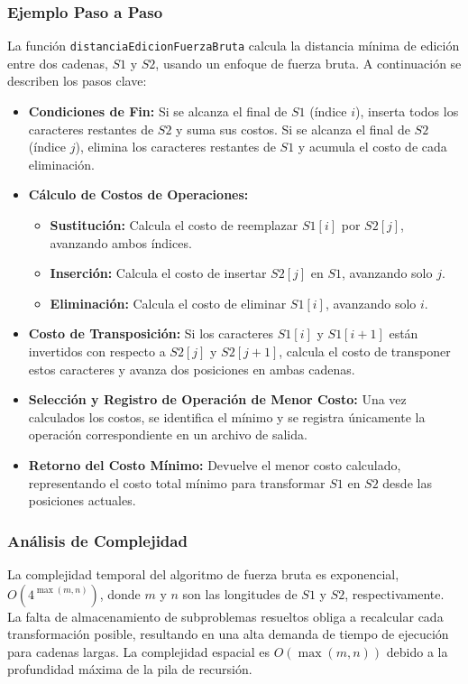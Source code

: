 \subsubsection{Ejemplo Paso a Paso}

La función \texttt{distanciaEdicionFuerzaBruta} calcula la distancia mínima de edición entre dos cadenas, \( S1 \) y \( S2 \), usando un enfoque de fuerza bruta. A continuación se describen los pasos clave:

\begin{itemize}
    \item \textbf{Condiciones de Fin:} Si se alcanza el final de \( S1 \) (índice \( i \)), inserta todos los caracteres restantes de \( S2 \) y suma sus costos. Si se alcanza el final de \( S2 \) (índice \( j \)), elimina los caracteres restantes de \( S1 \) y acumula el costo de cada eliminación.

    \item \textbf{Cálculo de Costos de Operaciones:} 
    \begin{itemize}
        \item \textbf{Sustitución:} Calcula el costo de reemplazar \( S1[i] \) por \( S2[j] \), avanzando ambos índices.
        \item \textbf{Inserción:} Calcula el costo de insertar \( S2[j] \) en \( S1 \), avanzando solo \( j \).
        \item \textbf{Eliminación:} Calcula el costo de eliminar \( S1[i] \), avanzando solo \( i \).
    \end{itemize}

    \item \textbf{Costo de Transposición:} Si los caracteres \( S1[i] \) y \( S1[i+1] \) están invertidos con respecto a \( S2[j] \) y \( S2[j+1] \), calcula el costo de transponer estos caracteres y avanza dos posiciones en ambas cadenas.

    \item \textbf{Selección y Registro de Operación de Menor Costo:} Una vez calculados los costos, se identifica el mínimo y se registra únicamente la operación correspondiente en un archivo de salida.

    \item \textbf{Retorno del Costo Mínimo:} Devuelve el menor costo calculado, representando el costo total mínimo para transformar \( S1 \) en \( S2 \) desde las posiciones actuales.
\end{itemize}


\subsubsection{Análisis de Complejidad}
La complejidad temporal del algoritmo de fuerza bruta es exponencial, \( O(4^{\max(m, n)}) \), donde \( m \) y \( n \) son las longitudes de \( S1 \) y \( S2 \), respectivamente. La falta de almacenamiento de subproblemas resueltos obliga a recalcular cada transformación posible, resultando en una alta demanda de tiempo de ejecución para cadenas largas. La complejidad espacial es \( O(\max(m, n)) \) debido a la profundidad máxima de la pila de recursión.

